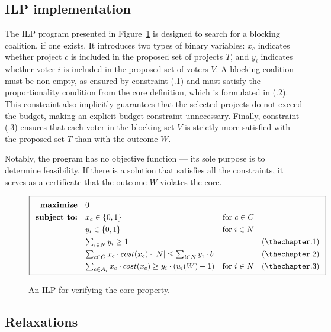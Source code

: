 \documentclass[magisterska,en]{pracamgr}
\begin{document}
\subsection{ILP implementation}

The ILP program presented in Figure~\ref{core-ILP} is designed to search for a blocking coalition, if one exists. It introduces two types of binary variables: $x_c$ indicates whether project $c$ is included in the proposed set of projects $T$, and $y_i$ indicates whether voter $i$ is included in the proposed set of voters $V$. A blocking coalition must be non-empty, as ensured by constraint (\thechapter.1) and must satisfy the proportionality condition from the core definition, which is formulated in (\thechapter.2). This constraint also implicitly guarantees that the selected projects do not exceed the budget, making an explicit budget constraint unnecessary. Finally, constraint (\thechapter.3) ensures that each voter in the blocking set $V$ is strictly more satisfied with the proposed set $T$ than with the outcome $W$.

Notably, the program has no objective function --- its sole purpose is to determine feasibility. If there is a solution that satisfies all the constraints, it serves as a certificate that the outcome $W$ violates the core.

\begin{figure}[h!]
$$
\boxed{
\renewcommand{\arraystretch}{1.3}
\begin{array}{rlrr}
\textbf{maximize}    & 0 & \\
\textbf{subject to:} & x_c\in\{0,1\} & \mbox{for } c\in C & \\
                     & y_i\in\{0,1\} & \mbox{for } i\in N & \\
                     & \sum_{i\in N}y_i\geq 1 & & \text{(\thechapter.1)} \\
                     & \sum_{c\in C}x_c\cdot cost(x_c)\cdot|N|\leq\sum_{i\in N}y_i\cdot b & & \text{(\thechapter.2)} \\
                     & \sum_{c\in A_i}x_c\cdot cost(x_c)\geq y_i\cdot(u_i(W)+1) & \mbox{for } i\in N & \text{(\thechapter.3)}
\end{array}
}
$$
\caption{An ILP for verifying the core property.}
\label{core-ILP}
\end{figure}

\subsection{Relaxations}
\end{document}
